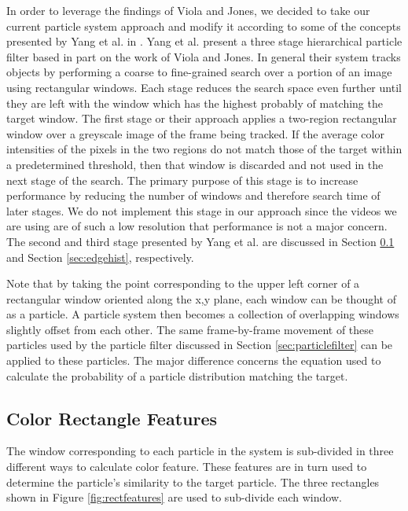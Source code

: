 \documentclass[11pt]{article}
\begin{document}
In order to leverage the findings of Viola and Jones, we decided to take our current particle system approach and modify it according to some of the concepts presented by Yang et al. in \cite{hybrid}. Yang et al. present a three stage hierarchical particle filter based in part on the work of Viola and Jones. In general their system tracks objects by performing a coarse to fine-grained search over a portion of an image using rectangular windows. Each stage reduces the search space even further until they are left with the window which has the highest probably of matching the target window. The first stage or their approach applies a two-region rectangular window over a greyscale image of the frame being tracked. If the average color intensities of the pixels in the two regions do not match those of the target within a predetermined threshold, then that window is discarded and not used in the next stage of the search. The primary purpose of this stage is to increase performance by reducing the number of windows and therefore search time of later stages. We do not implement this stage in our approach since the videos we are using are of such a low resolution that performance is not a major concern. The second and third stage presented by Yang et al. are discussed in Section \ref{sec:colorrects} and Section \ref{sec:edgehist}, respectively.

Note that by taking the point corresponding to the upper left corner of a rectangular window oriented along the x,y plane, each window can be thought of as a particle. A particle system then becomes a collection of overlapping windows slightly offset from each other. The same frame-by-frame movement of these particles used by the particle filter discussed in Section \ref{sec:particlefilter} can be applied to these particles. The major difference concerns the equation used to calculate the probability of a particle distribution matching the target.


\subsection{Color Rectangle Features}
\label{sec:colorrects}

The window corresponding to each particle in the system is sub-divided in three different ways to calculate color feature. These features are in turn used to determine the particle's similarity to the target particle. The three rectangles shown in Figure \ref{fig:rectfeatures} are used to sub-divide each window.
\end{document}
